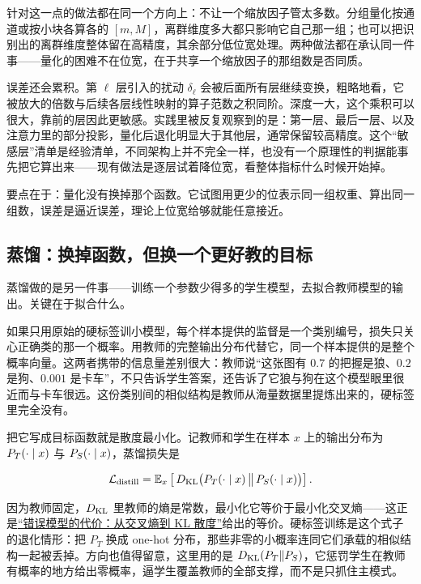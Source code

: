 针对这一点的做法都在同一个方向上：不让一个缩放因子管太多数。分组量化按通道或按小块各算各的 \([m, M]\)，离群维度多大都只影响它自己那一组；也可以把识别出的离群维度整体留在高精度，其余部分低位宽处理。两种做法都在承认同一件事——量化的困难不在位宽，在于共享一个缩放因子的那组数是否同质。

误差还会累积。第 \(\ell\) 层引入的扰动 \(\delta_\ell\) 会被后面所有层继续变换，粗略地看，它被放大的倍数与后续各层线性映射的算子范数之积同阶。深度一大，这个乘积可以很大，靠前的层因此更敏感。实践里被反复观察到的是：第一层、最后一层、以及注意力里的部分投影，量化后退化明显大于其他层，通常保留较高精度。这个``敏感层''清单是经验清单，不同架构上并不完全一样，也没有一个原理性的判据能事先把它算出来——现有做法是逐层试着降位宽，看整体指标什么时候开始掉。

要点在于：量化没有换掉那个函数。它试图用更少的位表示同一组权重、算出同一组数，误差是逼近误差，理论上位宽给够就能任意接近。

\subsection{蒸馏：换掉函数，但换一个更好教的目标}

蒸馏做的是另一件事——训练一个参数少得多的学生模型，去拟合教师模型的输出。关键在于拟合什么。

如果只用原始的硬标签训小模型，每个样本提供的监督是一个类别编号，损失只关心正确类的那一个概率。用教师的完整输出分布代替它，同一个样本提供的是整个概率向量。这两者携带的信息量差别很大：教师说``这张图有 \(0.7\) 的把握是狼、\(0.2\) 是狗、\(0.001\) 是卡车''，不只告诉学生答案，还告诉了它狼与狗在这个模型眼里很近而与卡车很远。这份类别间的相似结构是教师从海量数据里提炼出来的，硬标签里完全没有。

把它写成目标函数就是散度最小化。记教师和学生在样本 \(x\) 上的输出分布为 \(P_T(\cdot \mid x)\) 与 \(P_S(\cdot \mid x)\)，蒸馏损失是

\[
  \mathcal{L}_{\text{distill}} = \mathbb{E}_{x}\left[\, D_{\mathrm{KL}}\bigl(P_T(\cdot \mid x) \,\big\|\, P_S(\cdot \mid x)\bigr) \right].
\]

因为教师固定，\(D_{\mathrm{KL}}\) 里教师的熵是常数，最小化它等价于最小化交叉熵——这正是\hyperref[sec:07-Information-Theory/03-Divergences/01]{``错误模型的代价：从交叉熵到 KL 散度''}给出的等价。硬标签训练是这个式子的退化情形：把 \(P_T\) 换成 one-hot 分布，那些非零的小概率连同它们承载的相似结构一起被丢掉。方向也值得留意，这里用的是 \(D_{\mathrm{KL}}(P_T \| P_S)\)，它惩罚学生在教师有概率的地方给出零概率，逼学生覆盖教师的全部支撑，而不是只抓住主模式。

